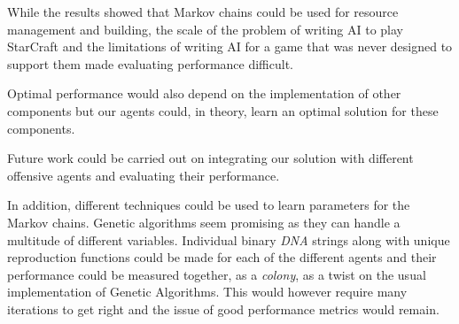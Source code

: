 
While the results showed that Markov chains could be used for resource management and building, the scale of the problem of writing AI to play StarCraft and the limitations of writing AI for a game that was never designed to support them made evaluating performance difficult.

Optimal performance would also depend on the implementation of other components but our agents could, in theory, learn an optimal solution for these components.






Future work could be carried out on integrating our solution with different offensive agents and evaluating their performance.

In addition, different techniques could be used to learn parameters for the Markov chains. Genetic algorithms seem promising as they can handle a multitude of different variables. Individual binary \textit{DNA} strings along with unique reproduction functions could be made for each of the different agents and their performance could be measured together, as a \textit{colony}, as a twist on the usual implementation of Genetic Algorithms. This would however require many iterations to get right and the issue of good performance metrics would remain.

